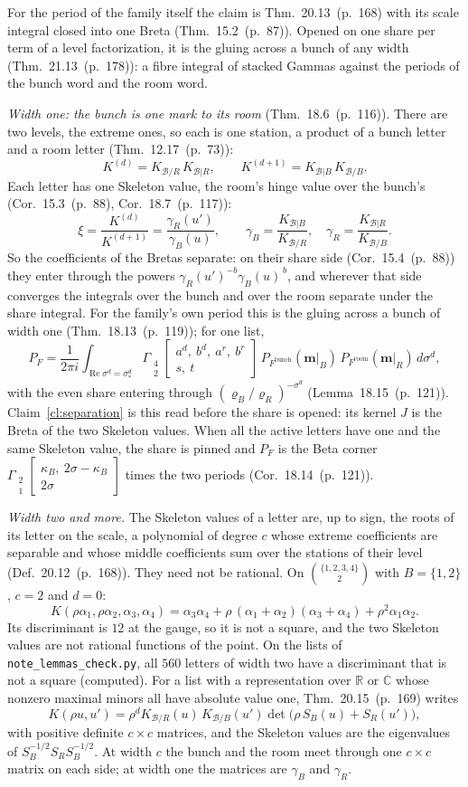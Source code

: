 \documentclass[11pt]{article}
\newcommand{\cB}{\mathcal B}
\newcommand{\mvec}{\mathbf m}
\newcommand{\Gst}[4]{\Gamma_{\substack{#1\\#2}}\!\begin{bmatrix}#3\\#4\end{bmatrix}}
\DeclareMathOperator{\re}{Re}
\newcommand{\hb}[2]{#1~(p.~#2)}   %
\theoremstyle{plain}
\theoremstyle{remark}
\begin{document}
For the period of the family itself the claim is Thm.~\hb{20.13}{168} with its scale integral closed into one Breta (Thm.~\hb{15.2}{87}). Opened on one share per term of a level factorization, it is the gluing across a bunch of any width (Thm.~\hb{21.13}{178}): a fibre integral of stacked Gammas against the periods of the bunch word and the room word.

\emph{Width one: the bunch is one mark to its room} (Thm.~\hb{18.6}{116}). There are two levels, the extreme ones, so each is one station, a product of a bunch letter and a room letter (Thm.~\hb{12.17}{73}):
\[
K^{(d)}=K_{\cB/R}\,K_{\cB|R},\qquad K^{(d+1)}=K_{\cB|B}\,K_{\cB/B}.
\]
Each letter has one Skeleton value, the room's hinge value over the bunch's (Cor.~\hb{15.3}{88}, Cor.~\hb{18.7}{117}):
\[
\xi=\frac{K^{(d)}}{K^{(d+1)}}=\frac{\gamma_R(u')}{\gamma_B(u)},\qquad \gamma_B=\frac{K_{\cB|B}}{K_{\cB/R}},\quad \gamma_R=\frac{K_{\cB|R}}{K_{\cB/B}}.
\]
So the coefficients of the Bretas separate: on their share side (Cor.~\hb{15.4}{88}) they enter through the powers $\gamma_R(u')^{-b}\gamma_B(u)^{\,b}$, and wherever that side converges the integrals over the bunch and over the room separate under the share integral. For the family's own period this is the gluing across a bunch of width one (Thm.~\hb{18.13}{119}); for one list,
\[
P_F=\frac1{2\pi i}\int_{\re\sigma^d=\sigma^d_\ast}\Gst42{a^d,\ b^d,\ a^r,\ b^r}{s,\ t}\,P_{F^{\mathrm{bunch}}}(\mvec|_B)\,P_{F^{\mathrm{room}}}(\mvec|_R)\,d\sigma^d,
\]
with the even share entering through $(\varrho_B/\varrho_R)^{-\sigma^d}$ (Lemma~\hb{18.15}{121}). Claim~\ref{cl:separation} is this read before the share is opened: its kernel $J$ is the Breta of the two Skeleton values. When all the active letters have one and the same Skeleton value, the share is pinned and $P_F$ is the Beta corner $\Gst21{\kappa_B,\ 2\sigma-\kappa_B}{2\sigma}$ times the two periods (Cor.~\hb{18.14}{121}).

\emph{Width two and more.} The Skeleton values of a letter are, up to sign, the roots of its letter on the scale, a polynomial of degree $c$ whose extreme coefficients are separable and whose middle coefficients sum over the stations of their level (Def.~\hb{20.12}{168}). They need not be rational. On $\binom{\{1,2,3,4\}}2$ with $B=\{1,2\}$, $c=2$ and $d=0$:
\[
K(\rho\alpha_1,\rho\alpha_2,\alpha_3,\alpha_4)=\alpha_3\alpha_4+\rho\,(\alpha_1+\alpha_2)(\alpha_3+\alpha_4)+\rho^2\alpha_1\alpha_2 .
\]
Its discriminant is $12$ at the gauge, so it is not a square, and the two Skeleton values are not rational functions of the point. On the lists of \texttt{note\_lemmas\_check.py}, all $560$ letters of width two have a discriminant that is not a square (computed). For a list with a representation over $\mathbb R$ or $\mathbb C$ whose nonzero maximal minors all have absolute value one, Thm.~\hb{20.15}{169} writes
\[
K(\rho u,u')=\rho^{d}K_{\cB/R}(u)\,K_{\cB/B}(u')\det\big(\rho\,S_B(u)+S_R(u')\big),
\]
with positive definite $c\times c$ matrices, and the Skeleton values are the eigenvalues of $S_B^{-1/2}S_RS_B^{-1/2}$. At width $c$ the bunch and the room meet through one $c\times c$ matrix on each side; at width one the matrices are $\gamma_B$ and $\gamma_R$.
\end{document}
